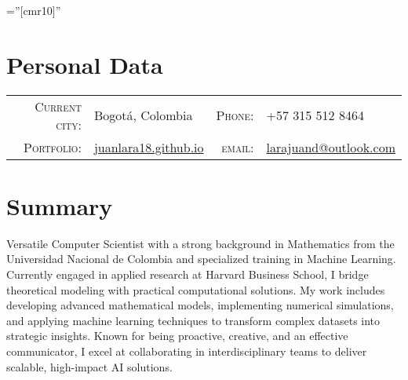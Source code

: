 \documentclass[a4paper,10pt]{article} %
\begin{document}
\pagestyle{empty} %

\font\fb=''[cmr10]'' %


\par{
\bigskip\par
} %
\vspace{0.5em}
\section{Personal Data}
\begin{table}[H]
    \centering
    \begin{tabular}{rlrl}
    \textsc{Current city:} & Bogotá, Colombia &
    \textsc{Phone:} & +57 315 512 8464\\
    \textsc{Portfolio:} & \href{https://juanlara18.github.io/Portafolio/}{juanlara18.github.io} &
    \textsc{email:} & \href{mailto:larajuand@outlook.com}{larajuand@outlook.com} 
    \end{tabular}
\end{table}


\vspace{-1.5em}
\section{Summary}

Versatile Computer Scientist with a strong background in Mathematics from the Universidad Nacional de Colombia and specialized training in Machine Learning. Currently engaged in applied research at Harvard Business School, I bridge theoretical modeling with practical computational solutions. My work includes developing advanced mathematical models, implementing numerical simulations, and applying machine learning techniques to transform complex datasets into strategic insights. Known for being proactive, creative, and an effective communicator, I excel at collaborating in interdisciplinary teams to deliver scalable, high-impact AI solutions.
\end{document}
